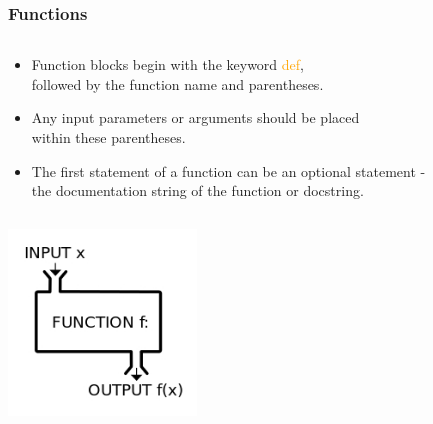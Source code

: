 \documentclass{beamer}
\begin{document}
\begin{frame}
	\frametitle{Functions}
	\begin{columns}[c]
		\begin{column}{30cm}
			\vspace{.1cm}
			\begin{itemize}
				\justifying
				\item Function blocks begin with the keyword \textcolor{orange}{def}, \\
				followed by the function name and parentheses.
				\item Any input parameters or arguments should be placed \\
				within these parentheses.
				\item The first statement of a function can be an optional statement - \\
				the documentation string of the function or docstring.
			\end{itemize}
		\end{column}
	\end{columns}
	\vspace{.1cm}
	\hspace*{5cm} \includegraphics[width=5cm]{figs/functions.jpg}
\end{frame}
\end{document}
